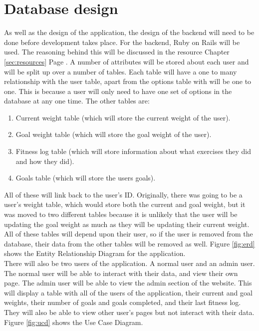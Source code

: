 \section{Database design}
As well as the design of the application, the design of the backend will need to be done before development takes place. For the backend, Ruby on Rails \citep{rails:2013} will be used. The reasoning behind this will be discussed in the resource Chapter \ref{sec:resources} Page \pageref{sec:resources}. A number of attributes will be stored about each user and will be split up over a number of tables. Each table will have a one to many relationship with the user table, apart from the options table with will be one to one. This is because a user will only need to have one set of options in the database at any one time. The other tables are:

\begin{enumerate}
\item Current weight table (which will store the current weight of the user).
\item Goal weight table (which will store the goal weight of the user).
\item Fitness log table (which will store information about what exercises they did and how they did).
\item Goals table (which will store the users goals).
\end{enumerate}

\noindent
All of these will link back to the user's ID. Originally, there was going to be a user's weight table, which would store both the current and goal weight, but it was moved to two different tables because it is unlikely that the user will be updating the goal weight as much as they will be updating their current weight. All of these tables will depend upon their user, so if the user is removed from the database, their data from the other tables will be removed as well. Figure \ref{fig:erd} shows the Entity Relationship Diagram for the application.\\

There will also be two users of the application. A normal user and an admin user. The normal user will be able to interact with their data, and view their own page. The admin user will be able to view the admin section of the website. This will display a table with all of the users of the application, their current and goal weights, their number of goals and goals completed, and their last fitness log. They will also be able to view other user's pages but not interact with their data. Figure \ref{fig:ucd} shows the Use Case Diagram.

